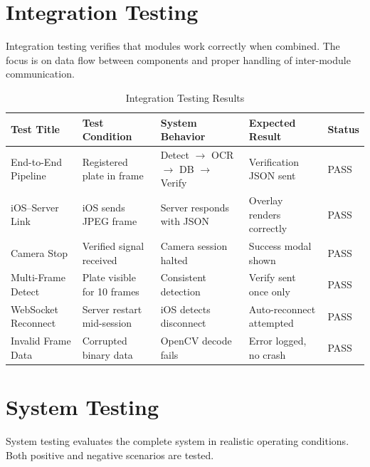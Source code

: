 \documentclass[11pt]{report}
\begin{document}
\section{Integration Testing}
Integration testing verifies that modules work correctly when combined. The focus is on data flow between components and proper handling of inter-module communication.

\begin{table}[H]
\centering
\renewcommand{\arraystretch}{1.4}
\setlength{\tabcolsep}{3pt}
\footnotesize
\begin{tabular}{| m{2.3cm} | m{3.2cm} | m{3.5cm} | m{3.2cm} | m{1.2cm} |}
\hline
\textbf{Test Title} & \textbf{Test Condition} & \textbf{System Behavior} & \textbf{Expected Result} & \textbf{Status} \\
\hline
End-to-End Pipeline & Registered plate in frame & Detect $\to$ OCR $\to$ DB $\to$ Verify & Verification JSON sent & PASS \\
\hline
iOS--Server Link & iOS sends JPEG frame & Server responds with JSON & Overlay renders correctly & PASS \\
\hline
Camera Stop & Verified signal received & Camera session halted & Success modal shown & PASS \\
\hline
Multi-Frame Detect & Plate visible for 10 frames & Consistent detection & Verify sent once only & PASS \\
\hline
WebSocket Reconnect & Server restart mid-session & iOS detects disconnect & Auto-reconnect attempted & PASS \\
\hline
Invalid Frame Data & Corrupted binary data & OpenCV decode fails & Error logged, no crash & PASS \\
\hline
\end{tabular}
\caption{Integration Testing Results}
\end{table}

\section{System Testing}
System testing evaluates the complete system in realistic operating conditions. Both positive and negative scenarios are tested.
\end{document}
